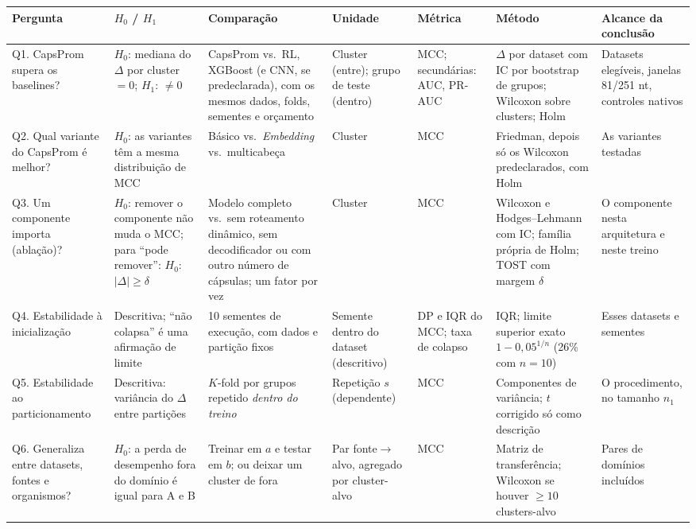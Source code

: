 \documentclass[11pt,a4paper]{article}
\begin{document}
\begin{landscape}
{\centering\scriptsize
{}
\label{tab:hipoteses}
\begin{tabularx}{\linewidth}{L{2.6cm}L{3.6cm}YL{2.1cm}L{1.5cm}L{3.6cm}L{3.0cm}}
\toprule
Pergunta & $H_0$ / $H_1$ & Comparação & Unidade & Métrica & Método & Alcance da conclusão \\
\midrule
Q1. CapsProm supera os baselines? & $H_0$: mediana do $\Delta$ por cluster $=0$; $H_1$: $\neq0$ & CapsProm vs.\ RL, XGBoost (e CNN, se predeclarada), com os mesmos dados, folds, sementes e orçamento & Cluster (entre); grupo de teste (dentro) & MCC; secundárias: AUC, PR-AUC & $\Delta$ por dataset com IC por bootstrap de grupos; Wilcoxon sobre clusters; Holm & Datasets elegíveis, janelas 81/251 nt, controles nativos \\
Q2. Qual variante do CapsProm é melhor? & $H_0$: as variantes têm a mesma distribuição de MCC & Básico vs.\ \emph{Embedding} vs.\ multicabeça & Cluster & MCC & Friedman, depois só os Wilcoxon predeclarados, com Holm & As variantes testadas \\
Q3. Um componente importa (ablação)? & $H_0$: remover o componente não muda o MCC; para ``pode remover'': $H_0$: $|\Delta|\geq\delta$ & Modelo completo vs.\ sem roteamento dinâmico, sem decodificador ou com outro número de cápsulas; um fator por vez & Cluster & MCC & Wilcoxon e Hodges--Lehmann com IC; família própria de Holm; TOST com margem $\delta$ & O componente nesta arquitetura e neste treino \\
Q4. Estabilidade à inicialização & Descritiva; ``não colapsa'' é uma afirmação de limite & 10 sementes de execução, com dados e partição fixos & Semente dentro do dataset (descritivo) & DP e IQR do MCC; taxa de colapso & IQR; limite superior exato $1-0{,}05^{1/n}$ (26\% com $n=10$) & Esses datasets e sementes \\
Q5. Estabilidade ao particionamento & Descritiva: variância do $\Delta$ entre partições & $K$-fold por grupos repetido \emph{dentro do treino} & Repetição $s$ (dependente) & MCC & Componentes de variância; $t$ corrigido só como descrição & O procedimento, no tamanho $n_1$ \\
Q6. Generaliza entre datasets, fontes e organismos? & $H_0$: a perda de desempenho fora do domínio é igual para A e B & Treinar em $a$ e testar em $b$; ou deixar um cluster de fora & Par fonte$\to$alvo, agregado por cluster-alvo & MCC & Matriz de transferência; Wilcoxon se houver $\geq10$ clusters-alvo & Pares de domínios incluídos \\

\end{tabularx}}
\end{landscape}
\end{document}
